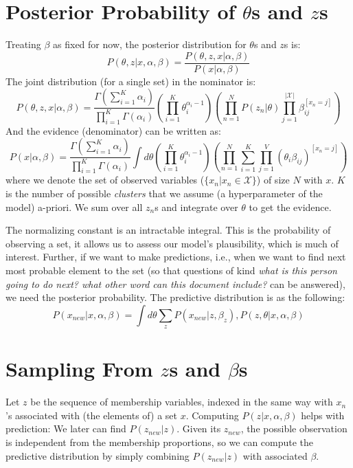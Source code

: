 \documentclass{article}%
\begin{document}
\section{Posterior Probability of  $\theta$s and $z$s}
Treating $\beta$ as fixed for now, the posterior distribution for $\theta$s and $z$s is:
\begin{equation*}
P(\theta, z|x, \alpha, \beta) = \frac{P(\theta, z, x|\alpha, \beta)}{P(x|\alpha, \beta)}
\end{equation*}
The joint distribution (for a single set) in the nominator is:
\begin{equation*}
P(\theta, z, x|\alpha, \beta) = \frac{\Gamma(\sum_{i=1}^K \alpha_i)}{\prod_{i=1}^K\Gamma(\alpha_i)} \left(\prod_{i=1}^K \theta_i^{\alpha_i -1} \right) \left(\prod_{n=1}^N P(z_n|\theta)\prod_{j=1}^{|
\mathcal{X}|}\beta_{ij}^{[x_n = j]}\right)
\end{equation*}
And the evidence (denominator) can be written as:
\begin{equation*}
P(x|\alpha, \beta) = \frac{\Gamma(\sum_{i=1}^K \alpha_i)}{\prod_{i=1}^K\Gamma(\alpha_i)} \int d\theta \left(\prod_{i=1}^K \theta_i^{\alpha_i -1} \right) \left(\prod_{n=1}^N\sum_{i=1}^K\prod_{j=1}^V(\theta_i\beta_{ij})^{[x_n = j]}\right)
\end{equation*}
where we denote the set of observed variables ($\{x_n| x_n\in \mathcal{X}\}$) of size $N$ with $x$. $K$ is the number of possible \textit{clusters} that we assume (a hyperparameter of the model) a-priori. We sum over all $z_n$s and integrate over $\theta$ to get the evidence.

The normalizing constant is an intractable integral. This is the probability of observing a set, it allows us to assess our model's plausibility, which is much of interest. Further, if we want to make predictions, i.e., when we want to find next most probable element to the set (so that questions of kind \textit{what is this person going to do next? what other word can this document include?} can be answered), we need the posterior probability. The predictive distribution is as the following:
\begin{equation*}
P(x_{new}|x, \alpha, \beta) = \int d\theta \sum_z P(x_{new}|z, \beta_z), P(z, \theta|x, \alpha, \beta)
\end{equation*}

\section{Sampling From $z$s and $\beta$s}
Let $z$ be the sequence of membership variables, indexed in the same way with $x_n$'s associated with (the elements of) a set $x$. Computing $P(z|x, \alpha, \beta)$ helps with prediction: We later can find $P(z_{new}|z)$. Given its $z_{new}$, the possible observation is independent from the membership proportions, so we can compute the predictive distribution by simply combining $P(z_{new}|z)$ with associated $\beta$. 
\end{document}
